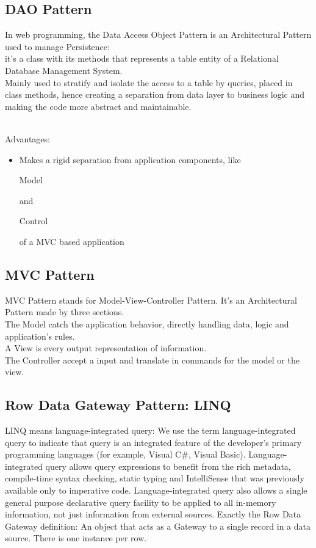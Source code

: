 \documentclass[12pt]{article}
\begin{document}
\subsection{DAO Pattern}
In web programming, the Data Access Object Pattern is an Architectural Pattern used to manage Persistence:\\
it's a class with its methods that represents a table entity of a Relational Database Management System.\\
Mainly used to stratify and isolate the access to a table by queries, placed in class methods, hence creating a separation from data layer to business logic and making the code more abstract and maintainable.\\
\\
\begin{itshape}
Advantages:
\end{itshape}
\begin{itemize}
\item Makes a rigid separation from application components, like 
\begin{itshape} 
Model 
\end{itshape} and 
\begin{itshape}
Control
\end{itshape} of a MVC based application
\end{itemize}
\subsection{MVC Pattern}
MVC Pattern stands for Model-View-Controller Pattern. It's an Architectural Pattern made by three sections.\\
The Model catch the application behavior, directly handling data, logic and application's rules.\\
A View is every output representation of information.\\
The Controller accept a input and translate in commands for the model or the view.\\
\subsection{Row Data Gateway Pattern: LINQ}
LINQ means language-integrated query: We use the term language-integrated query to indicate that query is an integrated feature of the developer's primary programming languages (for example, Visual C\#, Visual Basic). Language-integrated query allows query expressions to benefit from the rich metadata, compile-time syntax checking, static typing and IntelliSense that was previously available only to imperative code. Language-integrated query also allows a single general purpose declarative query facility to be applied to all in-memory information, not just information from external sources.
Exactly the Row Data Gateway definition: An object that acts as a Gateway to a single record in a data source. There is one instance per row.
\end{document}
